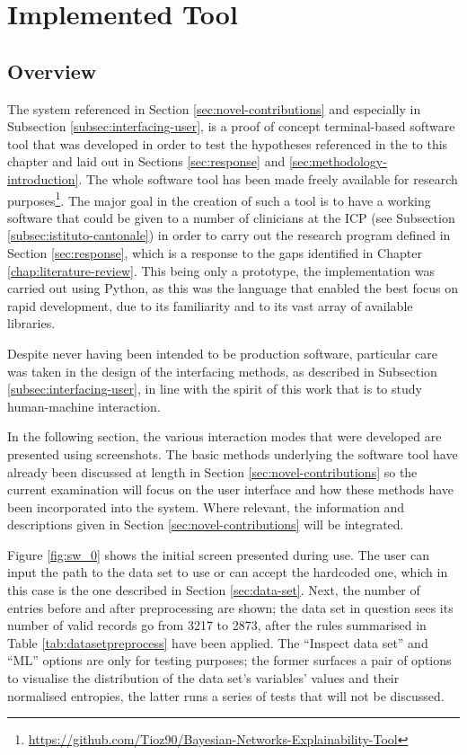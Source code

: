 \section{Implemented Tool} \label{sec:implemented-tool}
\subsection{Overview}
The system referenced in Section \ref{sec:novel-contributions} and especially in Subsection \ref{subsec:interfacing-user}, is a proof of concept terminal-based software tool that was developed in order to test the hypotheses referenced in the  to this chapter and laid out in Sections \ref{sec:response} and \ref{sec:methodology-introduction}.
The whole software tool has been made freely available for research purposes\footnote{\url{https://github.com/Tioz90/Bayesian-Networks-Explainability-Tool}}.
The major goal in the creation of such a tool is to have a working software that could be given to a number of clinicians at the ICP (see Subsection \ref{subsec:istituto-cantonale}) in order to carry out the research program defined in Section \ref{sec:response}, which is a response to the gaps identified in Chapter \ref{chap:literature-review}.
This being only a prototype, the implementation was carried out using Python, as this was the language that enabled the best focus on rapid development, due to its familiarity and to its vast array of available libraries.

Despite never having been intended to be production software, particular care was taken in the design of the interfacing methods, as described in Subsection \ref{subsec:interfacing-user}, in line with the spirit of this work that is to study human-machine interaction.

In the following section, the various interaction modes that were developed are presented using screenshots.
The basic methods underlying the software tool have already been discussed at length in Section \ref{sec:novel-contributions} so the current examination will focus on the user interface and how these methods have been incorporated into the system.
Where relevant, the information and descriptions given in Section \ref{sec:novel-contributions} will be integrated.

Figure \ref{fig:sw_0} shows the initial screen presented during use.
The user can input the path to the data set to use or can accept the hardcoded one, which in this case is the one described in Section \ref{sec:data-set}.
Next, the number of entries before and after preprocessing are shown; the data set in question sees its number of valid records go from 3217 to 2873, after the rules summarised in Table \ref{tab:datasetpreprocess} have been applied.
The \enquote{Inspect data set} and \enquote{ML} options are only for testing purposes; the former surfaces a pair of options to visualise the distribution of the data set's variables' values and their normalised entropies, the latter runs a series of tests that will not be discussed.

